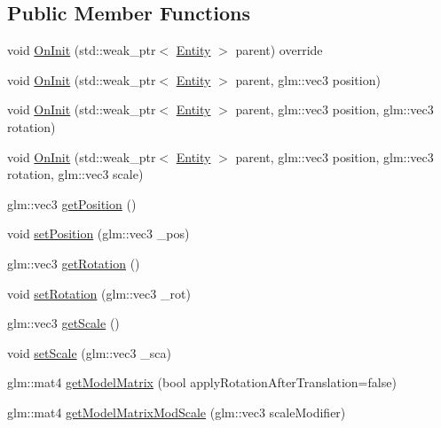 \subsection*{Public Member Functions}
\begin{DoxyCompactItemize}
\item 
void \hyperlink{classfrontier_1_1_transform_a4fef98c5ccbe2bb6303714c7da2ba4ef}{On\+Init} (std\+::weak\+\_\+ptr$<$ \hyperlink{classfrontier_1_1_entity}{Entity} $>$ parent) override
\item 
void \hyperlink{classfrontier_1_1_transform_a16be3bd6b4a08d457251aea5d65e618f}{On\+Init} (std\+::weak\+\_\+ptr$<$ \hyperlink{classfrontier_1_1_entity}{Entity} $>$ parent, glm\+::vec3 position)
\item 
void \hyperlink{classfrontier_1_1_transform_a084ca60da3da27b89acd8dd4c88e808c}{On\+Init} (std\+::weak\+\_\+ptr$<$ \hyperlink{classfrontier_1_1_entity}{Entity} $>$ parent, glm\+::vec3 position, glm\+::vec3 rotation)
\item 
void \hyperlink{classfrontier_1_1_transform_a19b8764fddefc031742d317811b261a0}{On\+Init} (std\+::weak\+\_\+ptr$<$ \hyperlink{classfrontier_1_1_entity}{Entity} $>$ parent, glm\+::vec3 position, glm\+::vec3 rotation, glm\+::vec3 scale)
\item 
glm\+::vec3 \hyperlink{classfrontier_1_1_transform_ac980c1cd517718fd4546a82659592c7c}{get\+Position} ()
\item 
void \hyperlink{classfrontier_1_1_transform_a39431f1267fe227a247f686787682aed}{set\+Position} (glm\+::vec3 \+\_\+pos)
\item 
glm\+::vec3 \hyperlink{classfrontier_1_1_transform_acb29cc4c641aa3ef6bed100b0bb96145}{get\+Rotation} ()
\item 
void \hyperlink{classfrontier_1_1_transform_a374a31649e6970b984495a287e473cbc}{set\+Rotation} (glm\+::vec3 \+\_\+rot)
\item 
glm\+::vec3 \hyperlink{classfrontier_1_1_transform_ae4e4e3f8fa4699d04d11a1a8eae8aff2}{get\+Scale} ()
\item 
void \hyperlink{classfrontier_1_1_transform_ae398759cf3fb01eeb6989aa52a602d55}{set\+Scale} (glm\+::vec3 \+\_\+sca)
\item 
glm\+::mat4 \hyperlink{classfrontier_1_1_transform_ac6eb361f0481c70157753d7965b92f4c}{get\+Model\+Matrix} (bool apply\+Rotation\+After\+Translation=false)
\item 
glm\+::mat4 \hyperlink{classfrontier_1_1_transform_a1a30ca83aca946f87087f70cebaf6c5d}{get\+Model\+Matrix\+Mod\+Scale} (glm\+::vec3 scale\+Modifier)

\end{DoxyCompactItemize}
